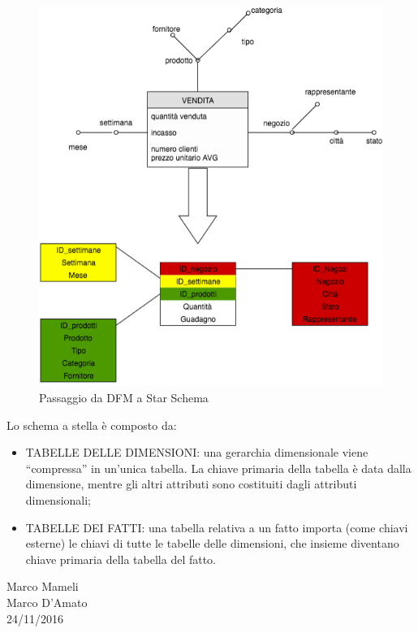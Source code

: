 \begin{center}
\begin{figure}[H]
\centering
\includegraphics[scale=0.8]{figures/star_schema.png}
\caption{Passaggio da DFM a Star Schema}
\end{figure}
\end{center}

Lo schema a stella è composto da: 

\begin{itemize}

\item{TABELLE DELLE DIMENSIONI}: una gerarchia dimensionale viene “compressa” in un’unica tabella. La chiave primaria della tabella è data dalla   dimensione, mentre gli altri attributi sono costituiti dagli attributi dimensionali;
\item{TABELLE DEI FATTI}: una tabella relativa a un fatto importa (come chiavi esterne) le chiavi di tutte le tabelle delle dimensioni, che insieme diventano chiave primaria       della tabella del fatto.  

\end{itemize}



\begin{flushright}Marco Mameli\\Marco D'Amato\\24/11/2016\end{flushright}



